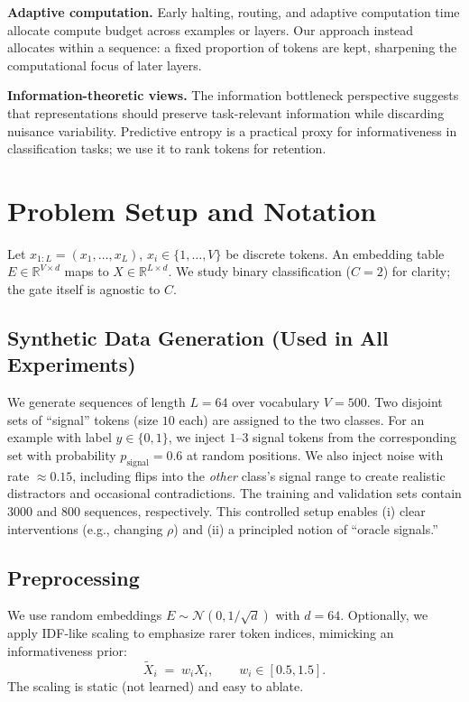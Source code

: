 \documentclass{article}
\newcommand{\Lseq}{L}
\newcommand{\dmodel}{d}
\begin{document}
\textbf{Adaptive computation.} Early halting, routing, and adaptive computation time allocate compute budget across examples or layers. Our approach instead allocates within a sequence: a fixed proportion of tokens are kept, sharpening the computational focus of later layers.

\textbf{Information-theoretic views.} The information bottleneck perspective suggests that representations should preserve task-relevant information while discarding nuisance variability. Predictive entropy is a practical proxy for informativeness in classification tasks; we use it to rank tokens for retention.

\section{Problem Setup and Notation}
\label{sec:setup-notation}
Let $x_{1:\Lseq}=(x_1,\dots,x_{\Lseq})$, $x_i\in\{1,\dots,V\}$ be discrete tokens. An embedding table $E\in\mathbb{R}^{V\times\dmodel}$ maps to $X\in\mathbb{R}^{\Lseq\times\dmodel}$. We study binary classification ($C{=}2$) for clarity; the gate itself is agnostic to $C$.

\subsection{Synthetic Data Generation (Used in All Experiments)}
We generate sequences of length $\Lseq{=}64$ over vocabulary $V{=}500$. Two disjoint sets of “signal” tokens (size $10$ each) are assigned to the two classes. For an example with label $y\in\{0,1\}$, we inject $1$--$3$ signal tokens from the corresponding set with probability $p_{\text{signal}}{=}0.6$ at random positions. We also inject noise with rate $\approx 0.15$, including flips into the \emph{other} class’s signal range to create realistic distractors and occasional contradictions. The training and validation sets contain $3000$ and $800$ sequences, respectively. This controlled setup enables (i) clear interventions (e.g., changing $\rho$) and (ii) a principled notion of “oracle signals.”




\subsection{Preprocessing}
We use random embeddings $E \sim \mathcal{N}(0, 1/\sqrt{\dmodel})$ with $\dmodel{=}64$. Optionally, we apply IDF-like scaling to emphasize rarer token indices, mimicking an informativeness prior:
\[
\tilde{X}_i \;=\; w_i X_i, \qquad  w_i \in [0.5,1.5].
\]
The scaling is static (not learned) and easy to ablate.
\end{document}
